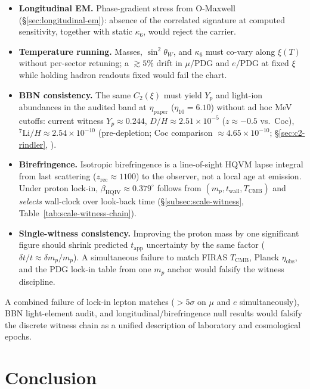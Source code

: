 \documentclass[11pt]{amsart}
\begin{document}
\begin{itemize}[nosep]
\item \textbf{Longitudinal EM.} Phase-gradient stress from O-Maxwell (\S\ref{sec:longitudinal-em}): absence of the correlated signature at computed sensitivity, together with static $\kappa_6$, would reject the carrier.
\item \textbf{Temperature running.} Masses, $\sin^2\theta_W$, and $\kappa_6$ must co-vary along $\xi(T)$ without per-sector retuning; a $\gtrsim 5\%$ drift in $\mu/\mathrm{PDG}$ and $e/\mathrm{PDG}$ at fixed $\xi$ while holding hadron readouts fixed would fail the chart.
\item \textbf{BBN consistency.} The same $C_2(\xi)$ must yield $Y_p$ and light-ion abundances in the audited band at $\eta_{\mathrm{paper}}$ ($\eta_{10}=6.10$) without ad hoc MeV cutoffs: current witness $Y_p\approx 0.244$, $D/H\approx 2.51\times10^{-5}$ ($z\approx -0.5$ vs.\ Coc), $^7\mathrm{Li}/H\approx 2.54\times10^{-10}$ (pre-depletion; Coc comparison $\approx 4.65\times10^{-10}$; \S\ref{sec:c2-rindler}, \cite{hqiv-bbn-paper}).
\item \textbf{Birefringence.} Isotropic birefringence is a line-of-sight HQVM lapse integral from last scattering ($z_{\mathrm{rec}}\approx 1100$) to the observer, not a local age at emission. Under proton lock-in, $\beta_{\mathrm{HQIV}}\approx 0.379^\circ$ follows from $(m_p,t_{\mathrm{wall}},T_{\mathrm{CMB}})$ and \emph{selects} wall-clock over look-back time (\S\ref{subsec:scale-witness}, Table~\ref{tab:scale-witness-chain}).
\item \textbf{Single-witness consistency.} Improving the proton mass by one significant figure should shrink predicted $t_{\mathrm{app}}$ uncertainty by the same factor ($\delta t/t\approx\delta m_p/m_p$). A simultaneous failure to match FIRAS $T_{\mathrm{CMB}}$, Planck $\eta_{\mathrm{obs}}$, and the PDG lock-in table from one $m_p$ anchor would falsify the witness discipline.
\end{itemize}

A combined failure of lock-in lepton matches ($>5\sigma$ on $\mu$ and $e$ simultaneously), BBN light-element audit, and longitudinal/birefringence null results would falsify the discrete witness chain as a unified description of laboratory and cosmological epochs.

\section{Conclusion}
\end{document}
